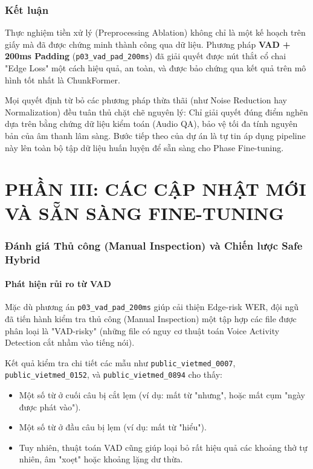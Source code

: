 \documentclass[12pt,a4paper]{article}
\begin{document}
\section{Kết luận}

Thực nghiệm tiền xử lý (Preprocessing Ablation) không chỉ là một kế hoạch trên giấy mà đã được chứng minh thành công qua dữ liệu. Phương pháp \textbf{VAD + 200ms Padding} (\texttt{p03\_vad\_pad\_200ms}) đã giải quyết được nút thắt cổ chai "Edge Loss" một cách hiệu quả, an toàn, và được bảo chứng qua kết quả trên mô hình tốt nhất là ChunkFormer.

Mọi quyết định từ bỏ các phương pháp thừa thãi (như Noise Reduction hay Normalization) đều tuân thủ chặt chẽ nguyên lý: Chỉ giải quyết đúng điểm nghẽn dựa trên bằng chứng dữ liệu kiểm toán (Audio QA), bảo vệ tối đa tính nguyên bản của âm thanh lâm sàng. Bước tiếp theo của dự án là tự tin áp dụng pipeline này lên toàn bộ tập dữ liệu huấn luyện để sẵn sàng cho Phase Fine-tuning.




\part*{PHẦN III: CÁC CẬP NHẬT MỚI VÀ SẴN SÀNG FINE-TUNING}
\setcounter{section}{0}

\section{Đánh giá Thủ công (Manual Inspection) và Chiến lược Safe Hybrid}

\subsection{Phát hiện rủi ro từ VAD}
Mặc dù phương án \texttt{p03\_vad\_pad\_200ms} giúp cải thiện Edge-risk WER, đội ngũ đã tiến hành kiểm tra thủ công (Manual Inspection) một tập hợp các file được phân loại là "VAD-risky" (những file có nguy cơ thuật toán Voice Activity Detection cắt nhầm vào tiếng nói). 

Kết quả kiểm tra chi tiết các mẫu như \texttt{public\_vietmed\_0007}, \texttt{public\_vietmed\_0152}, và \texttt{public\_vietmed\_0894} cho thấy:
\begin{itemize}[leftmargin=1.2cm]
    \item Một số từ ở cuối câu bị cắt lẹm (ví dụ: mất từ "nhưng", hoặc mất cụm "ngày được phát vào").
    \item Một số từ ở đầu câu bị lẹm (ví dụ: mất từ "hiểu").
    \item Tuy nhiên, thuật toán VAD cũng giúp loại bỏ rất hiệu quả các khoảng thở tự nhiên, âm "xoẹt" hoặc khoảng lặng dư thừa.
\end{itemize}
\end{document}
